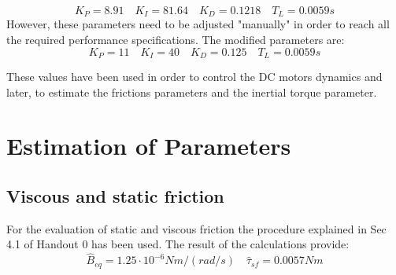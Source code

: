 \documentclass[11pt]{article}
\begin{document}
	\begin{equation}
		K_P = 8.91 \quad K_I = 81.64 \quad K_D = 0.1218 \quad T_L = 0.0059s
	\end{equation} 
However, these parameters need to be adjusted "manually" in order to reach all the required performance specifications. The modified parameters are:
	\begin{equation}
		K_P = 11 \quad K_I = 40 \quad K_D = 0.125 \quad T_L = 0.0059s
	\end{equation}

These values have been used in order to control the DC motors dynamics and later, to estimate the frictions parameters and the inertial
torque parameter.

\newpage
\section{Estimation of Parameters}
	\subsection{Viscous and static friction}
	For the evaluation of static and viscous friction the procedure explained in Sec 4.1 of Handout 0 has been used. The result of the calculations provide:
		\begin{equation}
			\hat B_{eq} = 1.25\cdot10^{-6}Nm/(rad/s) \quad \hat\tau_{sf} = 0.0057Nm
		\end{equation}
\end{document}

